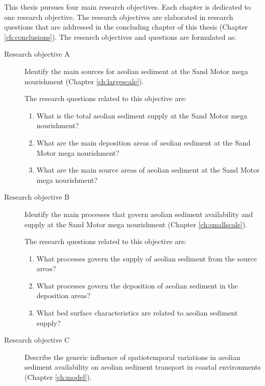This thesis pursues four main research objectives. Each chapter is
dedicated to one research objective. The research objectives are
elaborated in research questions that are addressed in the concluding
chapter of this thesis (Chapter \ref{ch:conclusions}). The research
objectives and questions are formulated as:

\begin{description}
\item[Research objective A] Identify the main sources for aeolian
  sediment at the Sand Motor mega nourishment (Chapter
  \ref{ch:largescale}).

  \medskip

  The research questions related to this objective are:

  \begin{enumerate}[{A}1]
  \item What is the total aeolian sediment supply at the Sand Motor
    mega nourishment?
  \item What are the main deposition areas of aeolian sediment at the
    Sand Motor mega nourishment?
  \item What are the main source areas of aeolian sediment at the Sand
    Motor mega nourishment?
  \end{enumerate}

  \bigskip

\item[Research objective B] Identify the main processes that govern
  aeolian sediment availability and supply at the Sand Motor mega
  nourishment (Chapter \ref{ch:smallscale}).

  \medskip

  The research questions related to this objective are:

  \begin{enumerate}[{B}1]
  \item What processes govern the supply of aeolian sediment from the
    source areas?
  \item What processes govern the deposition of aeolian sediment in
    the deposition areas?
  \item What bed surface characteristics are related to aeolian
    sediment supply?
  \end{enumerate}

  \bigskip

\item[Research objective C] Describe the generic influence of
  spatiotemporal variations in aeolian sediment availability on
  aeolian sediment transport in coastal environments (Chapter
  \ref{ch:model}).


\end{description}
